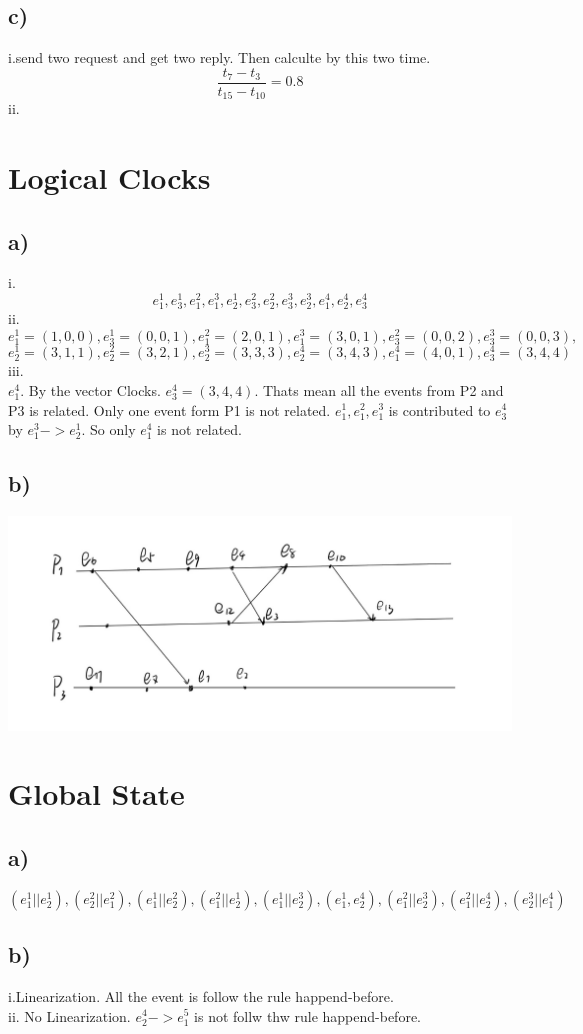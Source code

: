 \documentclass{article}
\begin{document}
\subsection*{c)}
i.send two request and get two reply. Then calculte by this two time.
\[\frac{t_7-t_3}{t_{15}-t_{10}}=0.8\]
ii.
\section{Logical Clocks}
\subsection*{a)}
i. \[e_1^1,e_3^1,e_1^2,e_1^3,e_2^1,e_3^2,e_2^2,e_3^3,e_2^3,e_1^4,e_2^4,e_3^4\]
ii.
\[e_1^1=(1,0,0),e_3^1=(0,0,1),e_1^2=(2,0,1),e_1^3=(3,0,1),e_3^2=(0,0,2),e_3^3=(0,0,3),\]
\[e_2^1=(3,1,1),e_2^2=(3,2,1),e_2^3=(3,3,3),e_2^4=(3,4,3),e_1^4=(4,0,1),e_3^4=(3,4,4)\]
iii.\\
$e_1^4$. By the vector Clocks. $e_3^4=(3,4,4)$. Thats  mean all the events from P2 and P3 is related. Only one event form P1 is not related. $e_1^1,e_1^2,e_1^3$ is contributed to $e_3^4$ by $e_1^3->e_2^1$. So only $e_1^4$ is not related.
\subsection*{b)}
\includegraphics[scale=0.5]{A2b.png}
\section{Global State}
\subsection*{a)}
\[(e^1_1||e_2^1),(e_2^2||e_1^2),(e_1^1||e_2^2),(e_1^2||e_2^1),(e_1^1||e_2^3),(e_1^1,e_2^4),(e_1^2||e_2^3),(e_1^2||e_2^4),(e_2^3||e_1^4)\]
\subsection*{b)}
i.Linearization. All the event is follow the rule happend-before.
\\ii. No Linearization. $e_2^4->e_1^5$ is not follw thw rule happend-before.
\end{document}
